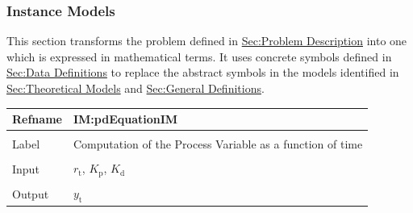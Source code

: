 \documentclass[12pt]{article}
\begin{document}
\subsubsection{Instance Models}
\label{Sec:IMs}
This section transforms the problem defined in \hyperref[Sec:ProbDesc]{Sec:Problem Description} into one which is expressed in mathematical terms. It uses concrete symbols defined in \hyperref[Sec:DDs]{Sec:Data Definitions} to replace the abstract symbols in the models identified in \hyperref[Sec:TMs]{Sec:Theoretical Models} and \hyperref[Sec:GDs]{Sec:General Definitions}.

\vspace{\baselineskip}
\noindent
\begin{minipage}{\textwidth}
\begin{tabular}{>{\raggedright}p{}>{\raggedright\arraybackslash}p{}}
\toprule \textbf{Refname} & \textbf{IM:pdEquationIM}
\label{IM:pdEquationIM}
\\ \midrule \\
Label & Computation of the Process Variable as a function of time
        
\\ \midrule \\
Input & ${r_{\text{t}}}$, ${K_{\text{p}}}$, ${K_{\text{d}}}$
        
\\ \midrule \\
Output & ${y_{\text{t}}}$
         

\end{tabular}
\end{minipage}
\end{document}
